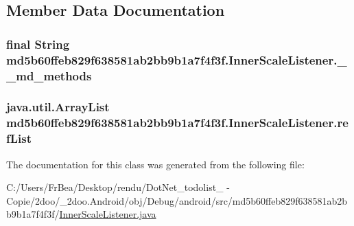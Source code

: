 \subsection{Member Data Documentation}
\hypertarget{classmd5b60ffeb829f638581ab2bb9b1a7f4f3f_1_1_inner_scale_listener_e1c1d8dc7c8fd6e763b6ea898d8955fd}{
\subsubsection[{\_\-\_\-md\_\-methods}]{\setlength{\rightskip}{0pt plus 5cm}final String {\bf md5b60ffeb829f638581ab2bb9b1a7f4f3f.InnerScaleListener.\_\-\_\-md\_\-methods}}}
\label{classmd5b60ffeb829f638581ab2bb9b1a7f4f3f_1_1_inner_scale_listener_e1c1d8dc7c8fd6e763b6ea898d8955fd}


\hypertarget{classmd5b60ffeb829f638581ab2bb9b1a7f4f3f_1_1_inner_scale_listener_0542c47f216a6c8a1867c887ac1f9cce}{
\subsubsection[{refList}]{\setlength{\rightskip}{0pt plus 5cm}java.util.ArrayList {\bf md5b60ffeb829f638581ab2bb9b1a7f4f3f.InnerScaleListener.refList}}}
\label{classmd5b60ffeb829f638581ab2bb9b1a7f4f3f_1_1_inner_scale_listener_0542c47f216a6c8a1867c887ac1f9cce}




The documentation for this class was generated from the following file:\begin{CompactItemize}
\item 
C:/Users/FrBea/Desktop/rendu/DotNet\_\-todolist\_ - Copie/2doo/\_\-2doo.Android/obj/Debug/android/src/md5b60ffeb829f638581ab2bb9b1a7f4f3f/\hyperlink{_inner_scale_listener_8java}{InnerScaleListener.java}\end{CompactItemize}
